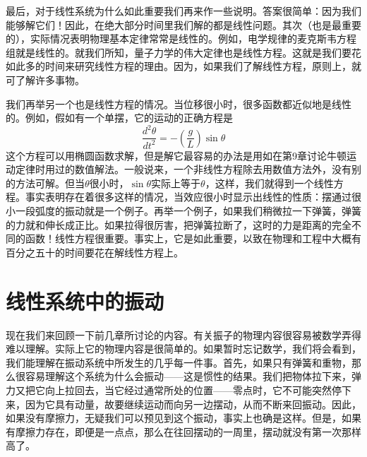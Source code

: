 最后，对于线性系统为什么如此重要我们再来作一些说明。答案很简单：因为我们能够解它们！因此，在绝大部分时间里我们解的都是线性问题。其次（也是最重要的），实际情况表明物理基本定律常常是线性的。例如，电学规律的麦克斯韦方程组就是线性的。就我们所知，量子力学的伟大定律也是线性方程。这就是我们要花如此多的时间来研究线性方程的理由。因为，如果我们了解线性方程，原则上，就可了解许多事物。

我们再举另一个也是线性方程的情况。当位移很小时，很多函数都近似地是线性的。例如，假如有一个单摆，它的运动的正确方程是
\begin{equation}
    \label{Eq:I:25:9}
    \frac{d^2\theta}{dt^2}=-\left ( \frac{g}{L} \right ) \sin\theta
\end{equation}
这个方程可以用椭圆函数求解，但是解它最容易的办法是用如在第9章讨论牛顿运动定律时用过的数值解法。一般说来，一个非线性方程除去用数值方法外，没有别的方法可解。但当$\theta$很小时，$\sin\theta$实际上等于$\theta$，这样，我们就得到一个线性方程。事实表明存在着很多这样的情况，当效应很小时显示出线性的性质：摆通过很小一段弧度的振动就是一个例子。再举一个例子，如果我们稍微拉一下弹簧，弹簧的力就和伸长成正比。如果拉得很厉害，把弹簧拉断了，这时的力是距离的完全不同的函数！线性方程很重要。事实上，它是如此重要，以致在物理和工程中大概有百分之五十的时间要花在解线性方程上。

\section{线性系统中的振动}

现在我们来回顾一下前几章所讨论的内容。有关振子的物理内容很容易被数学弄得难以理解。实际上它的物理内容是很简单的。如果暂时忘记数学，我们将会看到，我们能理解在振动系统中所发生的几乎每一件事。首先，如果只有弹簧和重物，那么很容易理解这个系统为什么会振动——这是惯性的结果。我们把物体拉下来，弹力又把它向上拉回去，当它经过通常所处的位置——零点时，它不可能突然停下来，因为它具有动量，故要继续运动而向另一边摆动，从而不断来回振动。因此，如果没有摩擦力，无疑我们可以预见到这个振动，事实上也确是这样。但是，如果有摩擦力存在，即便是一点点，那么在往回摆动的一周里，摆动就没有第一次那样高了。

